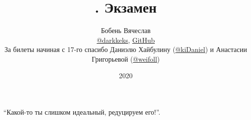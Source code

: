 \documentclass[a4paper]{article}
\title{\HugeАлгебра. Экзамен}
\author{
	Бобень Вячеслав \\
	\href{https://teleg.run/darkkeks}{@darkkeks},
    \href{https://github.com/LoDThe/hse-tex}{GitHub} \\
    За билеты начиная с 17-го спасибо Даниэлю Хайбулину (\href{https://teleg.run/kiDaniel}{@kiDaniel}) и Анастасии Григорьевой (\href{https://teleg.run/weifoll}{@weifoll})
}
\date{2020}
\begin{document}
    \maketitle

    \epigraph{
        ``Какой-то ты слишком идеальный, редуцируем его!''.
    }{}

    \tableofcontents

    \newpage

    
    
    
    
    
    
    
    
    
    
    
    
    
    
    
    
    
    
    
    
    
    
    
    
    
    
    
    
    
    
    
    
\end{document}
